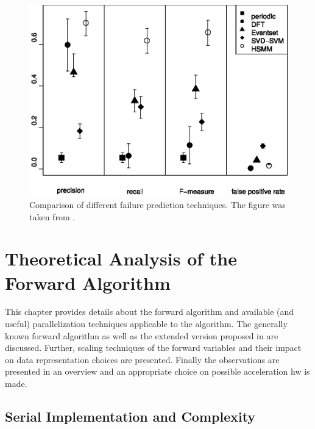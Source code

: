 \documentclass[mscthesis]{usiinfthesis}
\begin{document}
\begin{figure}
    \includegraphics[width=1\columnwidth]{./schema/results_salfner.eps}
    \caption{Comparison of different failure prediction techniques. The figure
        was taken from \cite{salfner08}.}
    \label{fig:results_salfner}
\end{figure}

\chapter{Theoretical Analysis of the Forward Algorithm}
\label{ch:analysis}
\glsresetall %

This chapter provides details about the forward algorithm and available (and
useful) parallelization techniques applicable to the algorithm. The generally
known forward algorithm as well as the extended version proposed in
\cite{salfner08} are discussed. Further, scaling techniques of the forward
variables and their impact on data representation choices are presented.
Finally the observations are presented in an overview and an appropriate choice
on possible acceleration \gls{hw} is made.

\section{Serial Implementation and Complexity}
\label{ch:analysis_serial}
\end{document}
